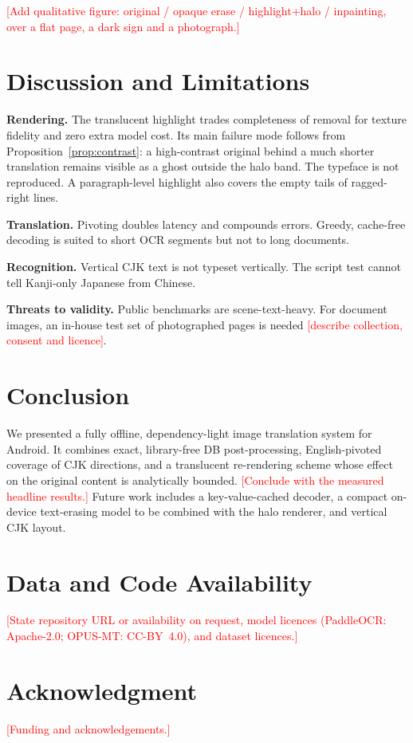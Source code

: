 \documentclass[journal]{IEEEtran}
\newcommand{\note}[1]{\textcolor{red}{[#1]}}
\newcommand{\note}[1]{}
\theoremstyle{definition}
\begin{document}
\note{Add qualitative figure: original / opaque erase / highlight+halo /
inpainting, over a flat page, a dark sign and a photograph.}

\section{Discussion and Limitations}
\textbf{Rendering.} The translucent highlight trades completeness of removal
for texture fidelity and zero extra model cost. Its main failure mode follows
from Proposition~\ref{prop:contrast}: a high-contrast original behind a much
shorter translation remains visible as a ghost outside the halo band. The
typeface is not reproduced. A paragraph-level highlight also covers the empty
tails of ragged-right lines.

\textbf{Translation.} Pivoting doubles latency and compounds errors. Greedy,
cache-free decoding is suited to short OCR segments but not to long documents.

\textbf{Recognition.} Vertical CJK text is not typeset vertically. The script
test cannot tell Kanji-only Japanese from Chinese.

\textbf{Threats to validity.} Public benchmarks are scene-text-heavy. For
document images, an in-house test set of photographed pages is needed
\note{describe collection, consent and licence}.

\section{Conclusion}
We presented a fully offline, dependency-light image translation system for
Android. It combines exact, library-free DB post-processing, English-pivoted
coverage of CJK directions, and a translucent re-rendering scheme whose effect
on the original content is analytically bounded. \note{Conclude with the
measured headline results.} Future work includes a key-value-cached decoder, a
compact on-device text-erasing model to be combined with the halo renderer, and
vertical CJK layout.

\section*{Data and Code Availability}
\note{State repository URL or availability on request, model licences
(PaddleOCR: Apache-2.0; OPUS-MT: CC-BY~4.0), and dataset licences.}

\section*{Acknowledgment}
\note{Funding and acknowledgements.}



\end{document}
